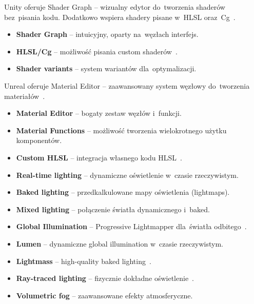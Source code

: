 Unity oferuje Shader Graph -- wizualny edytor do~tworzenia shaderów bez~pisania kodu. Dodatkowo wspiera shadery pisane w~HLSL oraz~Cg~\cite{farina2013shader}.

\begin{itemize}
    \item \textbf{Shader Graph} -- intuicyjny, oparty na~węzłach interfejs.
    \item \textbf{HLSL/Cg} -- możliwość pisania custom shaderów~\cite{farina2013shader}.
    \item \textbf{Shader variants} -- system wariantów dla~optymalizacji.
\end{itemize}

Unreal oferuje Material Editor -- zaawansowany system węzłowy do~tworzenia materiałów~\cite{unreal_docs}.

\begin{itemize}
    \item \textbf{Material Editor} -- bogaty zestaw węzłów i~funkcji.
    \item \textbf{Material Functions} -- możliwość tworzenia wielokrotnego użytku komponentów.
    \item \textbf{Custom HLSL} -- integracja własnego kodu HLSL~\cite{farina2013shader}.
\end{itemize}


\begin{itemize}
    \item \textbf{Real-time lighting} -- dynamiczne oświetlenie w~czasie rzeczywistym.
    \item \textbf{Baked lighting} -- przedkalkulowane mapy oświetlenia (lightmaps).
    \item \textbf{Mixed lighting} -- połączenie światła dynamicznego i~baked.
    \item \textbf{Global Illumination} -- Progressive Lightmapper dla~światła odbitego~\cite{gregory2018game}.
\end{itemize}

\begin{itemize}
    \item \textbf{Lumen} -- dynamiczne global illumination w~czasie rzeczywistym.
    \item \textbf{Lightmass} -- high-quality baked lighting~\cite{gregory2018game}.
    \item \textbf{Ray-traced lighting} -- fizycznie dokładne oświetlenie~\cite{parker2010optix}.
    \item \textbf{Volumetric fog} -- zaawansowane efekty atmosferyczne.
\end{itemize}

